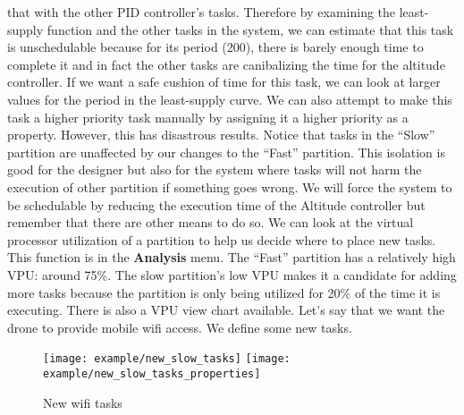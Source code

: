 that with the other PID controller's tasks. Therefore by examining the least-supply
function and the other tasks in the system, we can estimate that this task
is unschedulable because for its period (200), there is barely enough time
to complete it and in fact the other tasks are canibalizing the time
for the altitude controller. If we want a safe cushion of time for this task,
we can look at larger values for the period in the least-supply curve.
We can also attempt to make this task a higher priority task manually
by assigning it a higher priority as a property. However, this 
has disastrous results. 
Notice that tasks in the ``Slow'' partition are unaffected by our changes to the
``Fast'' partition. This isolation is good for the designer but also for
the system where tasks will not harm the execution of other partition
if something goes wrong. We will force the system to be schedulable
by reducing the execution time of the Altitude controller but remember
that there are other means to do so.
We can look at the virtual processor utilization of a partition
to help us decide where to place new tasks. This function is in the
\textbf{Analysis} menu. 
The ``Fast'' partition has a relatively high VPU: around 75\%. The slow partition's
low VPU makes it a candidate for adding more tasks because the partition is only
being utilized for 20\% of the time it is executing. There is also a VPU view
chart available. Let's say that we want the drone to provide mobile wifi access.
We define some new tasks. 
\begin{figure}[H]
\centering
\texttt{[image: example/new\_slow\_tasks]}
\texttt{[image: example/new\_slow\_tasks\_properties]}
\caption{New wifi tasks}
\end{figure}
